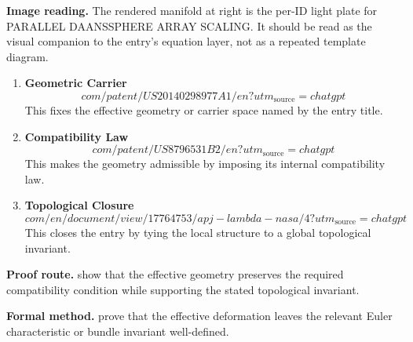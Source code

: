 \begin{samepage}
\noindent\begin{minipage}[t]{0.45\linewidth}
\vspace{0pt}
\raggedright
\scriptsize\textbf{Image reading.} The rendered manifold at right is the per-ID light plate for PARALLEL DAANSSPHERE ARRAY SCALING. It should be read as the visual companion to the entry's equation layer, not as a repeated template diagram.\par
\end{minipage}\hfill
\begin{minipage}[t]{0.53\linewidth}
\vspace*{-0.10in}
\raggedright
{}
\end{minipage}
\end{samepage}

\clearpage


\begin{enumerate}[leftmargin=1.6em,itemsep=9pt,topsep=6pt]
\item \textbf{Geometric Carrier}
\[
com/patent/US20140298977A1/en?utm_{\mathrm{source}}=chatgpt
\]
This fixes the effective geometry or carrier space named by the entry title.

\item \textbf{Compatibility Law}
\[
com/patent/US8796531B2/en?utm_{\mathrm{source}}=chatgpt
\]
This makes the geometry admissible by imposing its internal compatibility law.

\item \textbf{Topological Closure}
\[
com/en/document/view/17764753/apj-lambda-nasa/4?utm_{\mathrm{source}}=chatgpt
\]
This closes the entry by tying the local structure to a global topological invariant.
\end{enumerate}

\textbf{Proof route.} show that the effective geometry preserves the required compatibility condition while supporting the stated topological invariant.

\textbf{Formal method.} prove that the effective deformation leaves the relevant Euler characteristic or bundle invariant well-defined.

\medskip
{}

